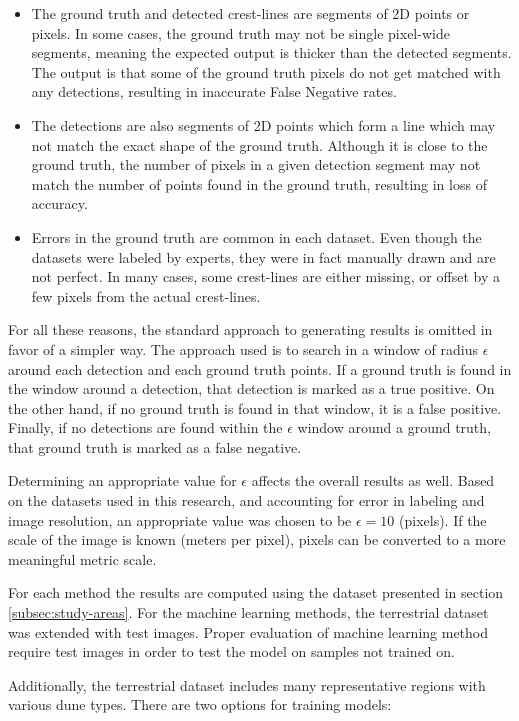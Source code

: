 \begin{itemize}
	\item The ground truth and detected crest-lines are segments of 2D points or pixels. In some cases, the ground truth may not be single pixel-wide segments, meaning the expected output is thicker than the detected segments. The output is that some of the ground truth pixels do not get matched with any detections, resulting in inaccurate False Negative rates.
	\item The detections are also segments of 2D points which form a line which may not match the exact shape of the ground truth. Although it is close to the ground truth, the number of pixels in a given detection segment may not match the number of points found in the ground truth, resulting in loss of accuracy.
	\item Errors in the ground truth are common in each dataset. Even though the datasets were labeled by experts, they were in fact manually drawn and are not perfect. In many cases, some crest-lines are either missing, or offset by a few pixels from the actual crest-lines.
\end{itemize}

For all these reasons, the standard approach to generating results is omitted in favor of a simpler way. The approach used is to search in a window of radius $\epsilon$ around each detection and each ground truth points. If a ground truth is found in the window around a detection, that detection is marked as a true positive. On the other hand, if no ground truth is found in that window, it is a false positive. Finally, if no detections are found within the $\epsilon$ window around a ground truth, that ground truth is marked as a false negative.

Determining an appropriate value for $\epsilon$ affects the overall results as well. Based on the datasets used in this research, and accounting for error in labeling and image resolution, an appropriate value was chosen to be $\epsilon=10$ (pixels). If the scale of the image is known (meters per pixel), pixels can be converted to a more meaningful metric scale.

For each method the results are computed using the dataset presented in section \ref{subsec:study-areas}. For the machine learning methods, the terrestrial dataset was extended with test images. Proper evaluation of machine learning method require test images in order to test the model on samples not trained on. 

Additionally, the terrestrial dataset includes many representative regions with various dune types. There are two options for training models:

